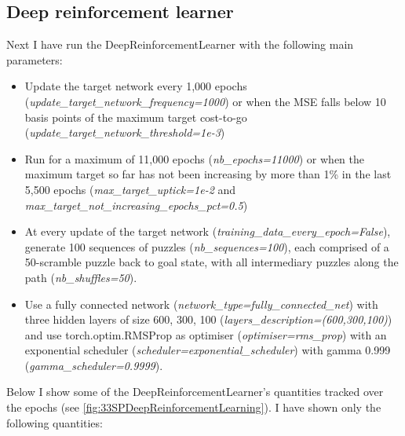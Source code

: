 \subsection{Deep reinforcement learner}
\label{sec:S33DRL}
Next I have run the DeepReinforcementLearner with the following main parameters:
\begin{itemize}
\item Update the target network every 1,000 epochs (\textit{update\_target\_network\_frequency=1000}) or when the MSE falls below 10 basis points of the maximum target cost-to-go (\textit{update\_target\_network\_threshold=1e-3})
\item Run for a maximum of 11,000 epochs (\textit{nb\_epochs=11000}) or when the maximum target so far has not been increasing by more than 1\% in the last 5,500 epochs (\textit{max\_target\_uptick=1e-2} and \textit{max\_target\_not\_increasing\_epochs\_pct=0.5})
\item At every update of the target network (\textit{training\_data\_every\_epoch=False}), generate 100 sequences of puzzles (\textit{nb\_sequences=100}), each comprised of a 50-scramble puzzle back to goal state, with all intermediary puzzles along the path (\textit{nb\_shuffles=50}).
\item Use a fully connected network (\textit{network\_type=fully\_connected\_net}) with three hidden layers of size 600, 300, 100 (\textit{layers\_description=(600,300,100)}) and use torch.optim.RMSProp as optimiser (\textit{optimiser=rms\_prop}) with an exponential scheduler (\textit{scheduler=exponential\_scheduler}) with gamma 0.999 (\textit{gamma\_scheduler=0.9999}).
\end{itemize}
Below I show some of the DeepReinforcementLearner's quantities tracked over the epochs (see \ref{fig:33SPDeepReinforcementLearning}). I have shown only the following quantities:
